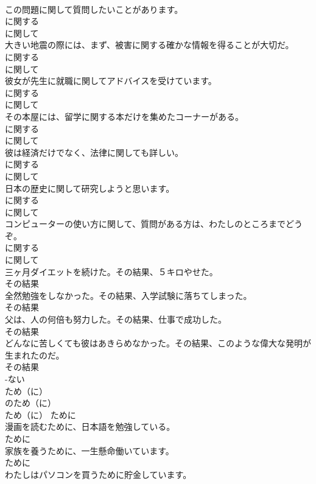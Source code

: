 \documentclass[8pt]{extreport}
\begin{document}
\begin{CJK}{UTF8}{min}
\\	この問題に関して質問したいことがあります。	
\\	に関する 
\\	に関して
\\	大きい地震の際には、まず、被害に関する確かな情報を得ることが大切だ。	
\\	に関する 
\\	に関して
\\	彼女が先生に就職に関してアドバイスを受けています。	
\\	に関する 
\\	に関して
\\	その本屋には、留学に関する本だけを集めたコーナーがある。	
\\	に関する 
\\	に関して
\\	彼は経済だけでなく、法律に関しても詳しい。	
\\	に関する 
\\	に関して
\\	日本の歴史に関して研究しようと思います。	
\\	に関する 
\\	に関して
\\	コンピューターの使い方に関して、質問がある方は、わたしのところまでどうぞ。	
\\	に関する 
\\	に関して
\\	三ヶ月ダイエットを続けた。その結果、５キロやせた。	
\\	その結果
\\	全然勉強をしなかった。その結果、入学試験に落ちてしまった。	
\\	その結果
\\	父は、人の何倍も努力した。その結果、仕事で成功した。	
\\	その結果
\\	どんなに苦しくても彼はあきらめなかった。その結果、このような偉大な発明が生まれたのだ。	
\\	その結果
\\	-ない
\\	ため（に）	
\\	のため（に）	
\\	ため（に）	ために
\\	漫画を読むために、日本語を勉強している。	
\\	ために
\\	家族を養うために、一生懸命働いています。	
\\	ために
\\	わたしはパソコンを買うために貯金しています。	

\end{CJK}
\end{document}
